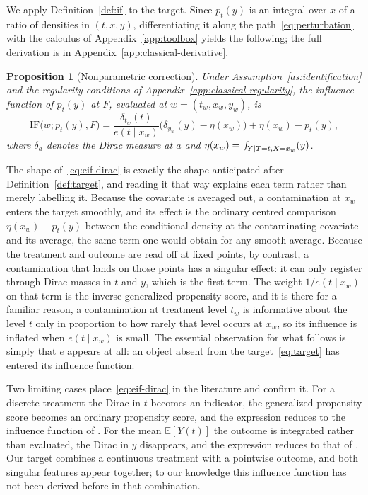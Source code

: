 \documentclass[11pt]{article}
\theoremstyle{plain}
\newtheorem{mypropo}{Proposition}
\theoremstyle{definition}
\theoremstyle{remark}
\newcommand{\pE}{\ensuremath{\mathbb{E}}}
\newcommand{\pf}[1]{\ensuremath{\,\mathlarger{\textit{f}}_{#1}}}
\newcommand{\IF}{\mathrm{IF}}
\newcommand{\gps}{e}
\begin{document}
We apply Definition~\ref{def:if} to the target. Since $p_t(y)$ is an integral over $x$ of a
ratio of densities in $(t,x,y)$, differentiating it along the path~\eqref{eq:perturbation}
with the calculus of Appendix~\ref{app:toolbox} yields the following; the full derivation is in
Appendix~\ref{app:classical-derivative}.

\begin{mypropo}[Nonparametric correction]
\label{prop:eif}
Under Assumption~\ref{as:identification} and the regularity conditions of
Appendix~\ref{app:classical-regularity}, the influence function of $p_t(y)$ at $F$, evaluated
at $w = (t_w,x_w,y_w)$, is
\begin{equation}
\IF\big(w; p_t(y), F\big)
= \frac{\delta_{t_w}(t)}{\gps(t \mid x_w)}
\Big( \delta_{y_w}(y) - \eta(x_w) \Big)
+ \eta(x_w) - p_t(y),
\label{eq:eif-dirac}
\end{equation}
where $\delta_a$ denotes the Dirac measure at $a$ and $\eta(x_w)=\pf{Y\mid T=t,X=x_w}(y)$.
\end{mypropo}

The shape of~\eqref{eq:eif-dirac} is exactly the shape anticipated after
Definition~\ref{def:target}, and reading it that way explains each term rather than merely
labelling it. Because the covariate is averaged out, a contamination at $x_w$ enters the
target smoothly, and its effect is the ordinary centred comparison $\eta(x_w) - p_t(y)$
between the conditional density at the contaminating covariate and its average, the same
term one would obtain for any smooth average. Because the treatment and outcome are read off
at fixed points, by contrast, a contamination that lands on those points has a singular
effect: it can only register through Dirac masses in $t$ and $y$, which is the first term.
The weight $1/\gps(t\mid x_w)$ on that term is the inverse generalized propensity score, and
it is there for a familiar reason, a contamination at treatment level $t_w$ is informative
about the level $t$ only in proportion to how rarely that level occurs at $x_w$, so its
influence is inflated when $\gps(t\mid x_w)$ is small. The essential observation for what
follows is simply that $\gps$ appears at all: an object absent from the
target~\eqref{eq:target} has entered its influence function.

Two limiting cases place~\eqref{eq:eif-dirac} in the literature and confirm it. For a discrete
treatment the Dirac in $t$ becomes an indicator, the generalized propensity score becomes an
ordinary propensity score, and the expression reduces to the influence function of
\citet{kennedy2023density}. For the mean $\pE[Y(t)]$ the outcome is integrated rather than
evaluated, the Dirac in $y$ disappears, and the expression reduces to that of
\citet{kennedy2017continuous}. Our target combines a continuous treatment with a pointwise
outcome, and both singular features appear together; to our knowledge this influence function
has not been derived before in that combination.
\end{document}
